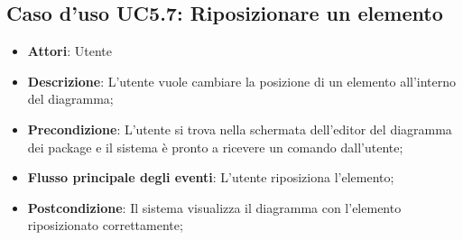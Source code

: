 \documentclass[../AnalisiDeiRequisiti.tex]{subfiles}
\begin{document}
			\subsection{Caso d'uso UC5.7: Riposizionare un elemento}
			\begin{itemize}
				\item \textbf{Attori}: Utente
				\item \textbf{Descrizione}: L'utente vuole cambiare la posizione di un elemento all'interno del diagramma;
				\item \textbf{Precondizione}: L'utente si trova nella schermata dell'editor del diagramma dei package e il sistema è pronto a ricevere un comando dall'utente;
				\item \textbf{Flusso principale degli eventi}: L'utente riposiziona l'elemento;
				\item \textbf{Postcondizione}: Il sistema visualizza il diagramma con l'elemento riposizionato correttamente;
			\end{itemize}
\end{document}
